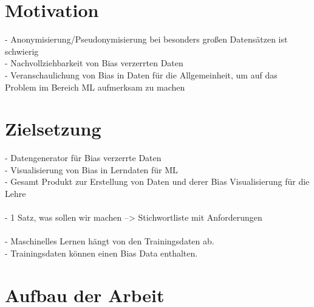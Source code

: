    \section{Motivation}
    \label{subsec:motivation}

    -	Anonymisierung/Pseudonymisierung bei besonders gro{\ss}en Datensätzen ist schwierig \\
    -	Nachvollziehbarkeit von Bias verzerrten Daten \\
    -	Veranschaulichung von Bias in Daten für die Allgemeinheit, um auf das Problem im Bereich ML aufmerksam zu machen 

    \section{Zielsetzung}
    \label{subsec:zielsetzung}
    -	Datengenerator für Bias verzerrte Daten \\
    -	Visualisierung von Bias in Lerndaten für ML \\
    -	Gesamt Produkt zur Erstellung von Daten und derer Bias Visualisierung für die Lehre \\
    \\
    -   1 Satz, was sollen wir machen --> Stichwortliste mit Anforderungen \\
    \\
    -   Maschinelles Lernen hängt von den Trainingsdaten ab.\\
    -   Trainingsdaten können einen Bias Data enthalten.\\

    \section{Aufbau der Arbeit}
    \label{subsec:aufbau der arbeit}


    \newpage